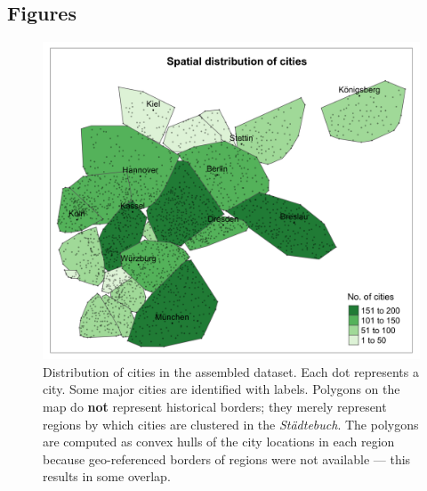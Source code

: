 \documentclass[11pt, a4paper]{article}
\begin{document}
\subsection*{Figures}

\begin{figure}[ht]
    \centering
    \includegraphics[scale=0.15]{paper/output/descriptive/map_cities.png}
    \caption{Distribution of cities in the assembled dataset. Each dot represents a city. Some major cities are identified with labels. Polygons on the map do \textbf{not} represent historical borders; they merely represent regions by which cities are clustered in the \textit{Städtebuch}. The polygons are computed as convex hulls of the city locations in each region because geo-referenced borders of regions were not available --- this results in some overlap.}
    \label{fig:map_cities}
\end{figure}
\end{document}
